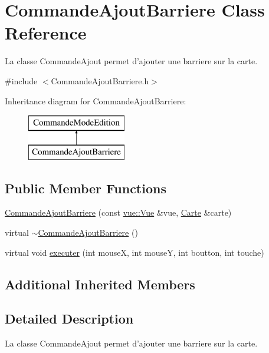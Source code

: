 \hypertarget{class_commande_ajout_barriere}{\section{Commande\-Ajout\-Barriere Class Reference}
\label{class_commande_ajout_barriere}
}


La classe Commande\-Ajout permet d'ajouter une barriere sur la carte.  




{\ttfamily \#include $<$Commande\-Ajout\-Barriere.\-h$>$}

Inheritance diagram for Commande\-Ajout\-Barriere\-:\begin{figure}[H]
\begin{center}
\leavevmode
\includegraphics[height=2.000000cm]{class_commande_ajout_barriere}
\end{center}
\end{figure}
\subsection*{Public Member Functions}
\begin{DoxyCompactItemize}
\item 
\hyperlink{class_commande_ajout_barriere_a97062e0aa94ec0c70d6e66050d835988}{Commande\-Ajout\-Barriere} (const \hyperlink{classvue_1_1_vue}{vue\-::\-Vue} \&vue, \hyperlink{class_carte}{Carte} \&carte)
\item 
virtual \hyperlink{class_commande_ajout_barriere_acd8fbb39e8062e5cc4959493c7ea3717}{$\sim$\-Commande\-Ajout\-Barriere} ()
\item 
virtual void \hyperlink{class_commande_ajout_barriere_a23c6176e97b56fed95b2e02b37515290}{executer} (int mouse\-X, int mouse\-Y, int boutton, int touche)
\end{DoxyCompactItemize}
\subsection*{Additional Inherited Members}


\subsection{Detailed Description}
La classe Commande\-Ajout permet d'ajouter une barriere sur la carte. 

